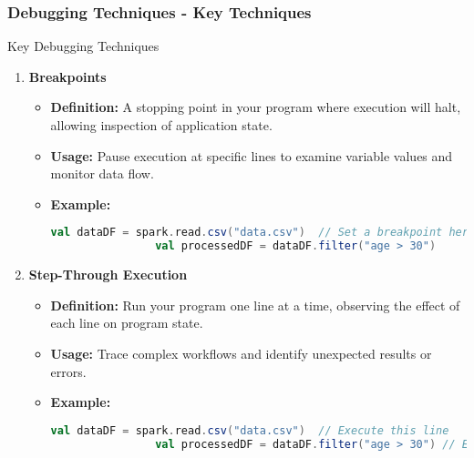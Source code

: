 \documentclass[aspectratio=169]{beamer}
\begin{document}
\begin{frame}[fragile]
    \frametitle{Debugging Techniques - Key Techniques}

    \begin{block}{Key Debugging Techniques}
        \begin{enumerate}
            \item \textbf{Breakpoints}
            \begin{itemize}
                \item \textbf{Definition:} A stopping point in your program where execution will halt, allowing inspection of application state.
                \item \textbf{Usage:} Pause execution at specific lines to examine variable values and monitor data flow.
                \item \textbf{Example:}
                \begin{lstlisting}[language=Scala]
                val dataDF = spark.read.csv("data.csv")  // Set a breakpoint here
                val processedDF = dataDF.filter("age > 30")
                \end{lstlisting}
            \end{itemize}

            \item \textbf{Step-Through Execution}
            \begin{itemize}
                \item \textbf{Definition:} Run your program one line at a time, observing the effect of each line on program state.
                \item \textbf{Usage:} Trace complex workflows and identify unexpected results or errors.
                \item \textbf{Example:}
                \begin{lstlisting}[language=Scala]
                val dataDF = spark.read.csv("data.csv")  // Execute this line
                val processedDF = dataDF.filter("age > 30") // Execute next and check filtering
                \end{lstlisting}
            \end{itemize}
        \end{enumerate}
    \end{block}
\end{frame}
\end{document}
